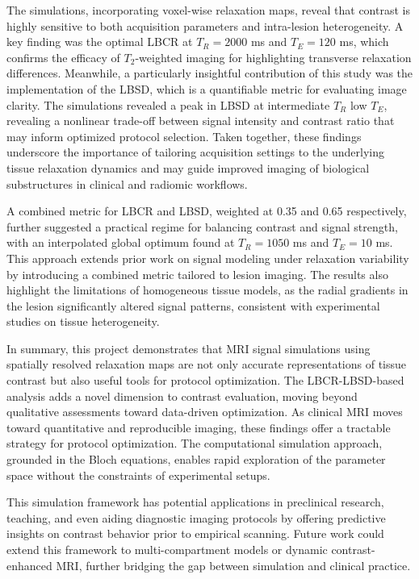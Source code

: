 \documentclass[10pt,a4paper,twoside]{article}
\begin{document}
The simulations, incorporating voxel-wise relaxation maps, reveal that contrast is highly sensitive to both acquisition parameters and intra-lesion heterogeneity. A key finding was the optimal LBCR at $T_R = 2000$ ms and $T_E = 120$ ms, which confirms the efficacy of $T_2$-weighted imaging for highlighting transverse relaxation differences. Meanwhile, a particularly insightful contribution of this study was the implementation of the LBSD, which is a quantifiable metric for evaluating image clarity. The simulations revealed a peak in LBSD at intermediate $T_R$ low $T_E$, revealing a nonlinear trade-off between signal intensity and contrast ratio that may inform optimized protocol selection. Taken together, these findings underscore the importance of tailoring acquisition settings to the underlying tissue relaxation dynamics and may guide improved imaging of biological substructures in clinical and radiomic workflows.

A combined metric for LBCR and LBSD, weighted at 0.35 and 0.65 respectively, further suggested a practical regime for balancing contrast and signal strength, with an interpolated global optimum found at $T_R = 1050$ ms and $T_E = 10$ ms. This approach extends prior work on signal modeling under relaxation variability by introducing a combined metric tailored to lesion imaging. The results also highlight the limitations of homogeneous tissue models, as the radial gradients in the lesion significantly altered signal patterns, consistent with experimental studies on tissue heterogeneity.

In summary, this project demonstrates that MRI signal simulations using spatially resolved relaxation maps are not only accurate representations of tissue contrast but also useful tools for protocol optimization. The LBCR-LBSD-based analysis adds a novel dimension to contrast evaluation, moving beyond qualitative assessments toward data-driven optimization. As clinical MRI moves toward quantitative and reproducible imaging, these findings offer a tractable strategy for protocol optimization. The computational simulation approach, grounded in the Bloch equations, enables rapid exploration of the parameter space without the constraints of experimental setups. 

This simulation framework has potential applications in preclinical research, teaching, and even aiding diagnostic imaging protocols by offering predictive insights on contrast behavior prior to empirical scanning. Future work could extend this framework to multi-compartment models or dynamic contrast-enhanced MRI, further bridging the gap between simulation and clinical practice.
\end{document}
